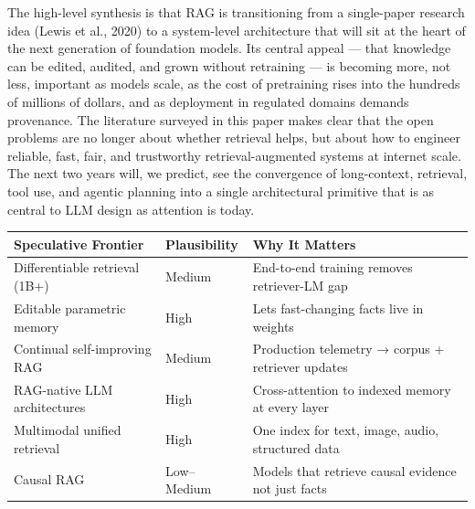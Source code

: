 The high-level synthesis is that RAG is transitioning from a single-paper research idea (Lewis et al., 2020) to a system-level architecture that will sit at the heart of the next generation of foundation models. Its central appeal --- that knowledge can be edited, audited, and grown without retraining --- is becoming more, not less, important as models scale, as the cost of pretraining rises into the hundreds of millions of dollars, and as deployment in regulated domains demands provenance. The literature surveyed in this paper makes clear that the open problems are no longer about whether retrieval helps, but about how to engineer reliable, fast, fair, and trustworthy retrieval-augmented systems at internet scale. The next two years will, we predict, see the convergence of long-context, retrieval, tool use, and agentic planning into a single architectural primitive that is as central to LLM design as attention is today.

{\def\LTcaptype{none} %
\begin{longtable}[]{@{}
  >{\raggedright\arraybackslash}p{}
  >{\raggedright\arraybackslash}p{}
  >{\raggedright\arraybackslash}p{}@{}}
\toprule\noalign{}
\begin{minipage}[b]{\linewidth}\raggedright
Speculative Frontier
\end{minipage} & \begin{minipage}[b]{\linewidth}\raggedright
Plausibility
\end{minipage} & \begin{minipage}[b]{\linewidth}\raggedright
Why It Matters
\end{minipage} \\
\midrule\noalign{}
\endhead
\bottomrule\noalign{}
\endlastfoot
Differentiable retrieval (1B+) & Medium & End-to-end training removes retriever-LM gap \\
Editable parametric memory & High & Lets fast-changing facts live in weights \\
Continual self-improving RAG & Medium & Production telemetry → corpus + retriever updates \\
RAG-native LLM architectures & High & Cross-attention to indexed memory at every layer \\
Multimodal unified retrieval & High & One index for text, image, audio, structured data \\
Causal RAG & Low--Medium & Models that retrieve causal evidence not just facts \\
\end{longtable}
}

